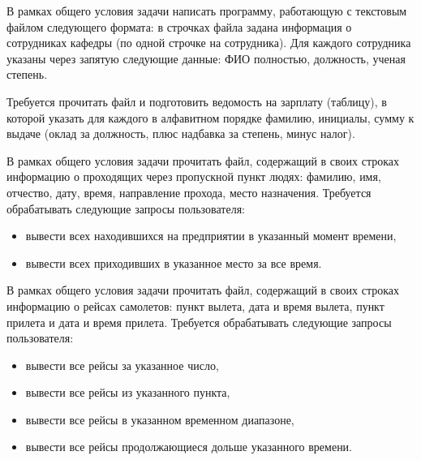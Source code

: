 \begin{zztask}
В рамках общего условия задачи написать программу, работающую с текстовым файлом
следующего формата: в строчках файла задана информация 
о сотрудниках кафедры (по одной строчке на сотрудника). Для каждого сотрудника
указаны через запятую следующие данные:
ФИО полностью, должность, ученая степень.

Требуется прочитать файл и подготовить ведомость на зарплату (таблицу), в которой
указать для каждого в алфавитном порядке фамилию, инициалы, сумму к выдаче (оклад 
за должность, плюс надбавка за степень, минус налог).
\end{zztask}


\begin{zztask}
В рамках общего условия задачи прочитать файл, содержащий в своих строках
информацию о проходящих через пропускной пункт людях: фамилию, имя, отчество,
дату, время, направление прохода, место назначения. Требуется обрабатывать
следующие запросы пользователя:
%
\begin{itemize}
\item вывести всех находившихся на предприятии в указанный момент времени,
\item вывести всех приходивших в указанное место за все время.
\end{itemize}
\end{zztask}


\begin{zztask}
В рамках общего условия задачи прочитать файл, содержащий в своих строках
информацию о рейсах самолетов: пункт вылета, дата и время вылета, пункт
прилета и дата и время прилета. Требуется обрабатывать следующие запросы
пользователя:
%
\begin{itemize}
\item вывести все рейсы за указанное число,
\item вывести все рейсы из указанного пункта,
\item вывести все рейсы в указанном временном диапазоне,
\item вывести все рейсы продолжающиеся дольше указанного времени.
\end{itemize}
\end{zztask}


